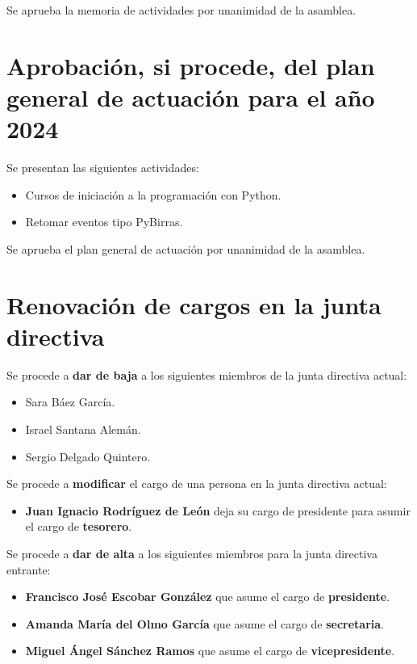 \documentclass[a4paper,12pt]{article}
\begin{document}
Se aprueba la memoria de actividades por unanimidad de la asamblea.

\section{Aprobación, si procede, del plan general de actuación para el año 2024}

Se presentan las siguientes actividades:

\begin{itemize}
    \item Cursos de iniciación a la programación con Python.
    \item Retomar eventos tipo PyBirras.
\end{itemize}

Se aprueba el plan general de actuación por unanimidad de la asamblea.\\

\section{Renovación de cargos en la junta directiva}

Se procede a \textbf{dar de baja} a los siguientes miembros de la junta directiva actual:

\begin{itemize}
    \item Sara Báez García.
    \item Israel Santana Alemán.
    \item Sergio Delgado Quintero.
\end{itemize}

Se procede a \textbf{modificar} el cargo de una persona en la junta directiva actual:

\begin{itemize}
    \item \textbf{Juan Ignacio Rodríguez de León} deja su cargo de presidente para asumir el cargo de \textbf{tesorero}.
\end{itemize}

Se procede a \textbf{dar de alta} a los siguientes miembros para la junta directiva entrante:

\begin{itemize}
    \item \textbf{Francisco José Escobar González} que asume el cargo de \textbf{presidente}.
    \item \textbf{Amanda María del Olmo García} que asume el cargo de \textbf{secretaria}.
    \item \textbf{Miguel Ángel Sánchez Ramos} que asume el cargo de \textbf{vicepresidente}.
\end{itemize}
\end{document}
